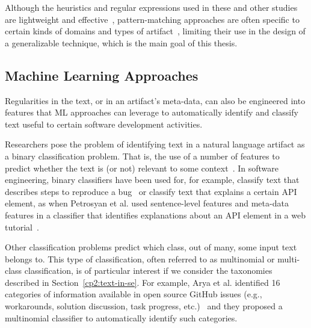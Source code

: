 Although the heuristics and regular expressions used in these and other studies~\cite{nadi2020, Maalej2013}
are lightweight and effective~\cite{Bavota2016}, 
pattern-matching approaches 
are often specific to certain kinds of domains and types of artifact~\cite{fucci2019}, 
limiting their use in the design of a generalizable technique, which is the main goal of this thesis.







\subsection{Machine Learning Approaches}
\label{cp2:machine-learning}


Regularities in the text, or in an artifact's meta-data, can also be 
engineered into features that \acf{ML} 
approaches can leverage to automatically identify and classify
text useful to certain software development activities. 




Researchers pose the problem of identifying text 
in a natural language artifact 
as a binary classification problem. 
That is, the use of a number of features 
to predict whether the text is (or not)
relevant to some context~\cite{}.
In software engineering, 
binary classifiers have been used for,
for example, classify text that describes steps to reproduce a bug~\cite{Chaparro2016} or 
classify text that explains a certain API element, as when 
Petrosyan et al. used 
 sentence-level features
and meta-data features in a classifier 
that 
identifies explanations about an API element  in a web tutorial~\cite{Petrosyan2015}.




Other classification problems predict which class, out of many, some input text belongs to. 
This type of classification, often referred to as multinomial or multi-class classification, 
is of particular interest if 
we consider the taxonomies described in Section~\ref{cp2:text-in-se}.
For example, Arya et al. identified 16 categories of  information available
in open source GitHub issues (e.g., workarounds, solution discussion, task progress, etc.)~\cite{Arya2019}
and they proposed a multinomial classifier 
to automatically identify such categories.








